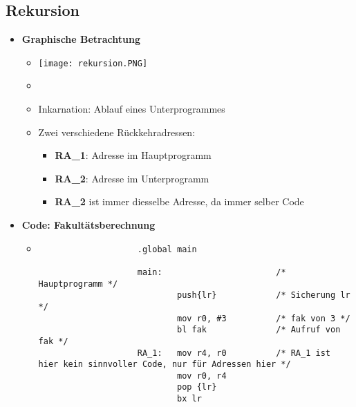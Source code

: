 \subsection{Rekursion}
    \begin{itemize}
        \item \textbf{Graphische Betrachtung}
            \begin{itemize}
                \item[] \texttt{[image: rekursion.PNG]}
                \item[] 
                \item Inkarnation: Ablauf eines Unterprogrammes
                \item Zwei verschiedene Rückkehradressen:
                    \begin{itemize}
                        \item \textbf{RA\_1}: Adresse im Hauptprogramm
                        \item \textbf{RA\_2}: Adresse im Unterprogramm
                        \item \textbf{RA\_2} ist immer diesselbe Adresse, da immer selber Code
                    \end{itemize} 
            \end{itemize}

\pagebreak

        \item \textbf{Code: Fakultätsberechnung}
            \begin{itemize}
                \item[]
                    \begin{verbatim}
                    .global main

                    main:                       /* Hauptprogramm */
                            push{lr}            /* Sicherung lr */
                            mov r0, #3          /* fak von 3 */
                            bl fak              /* Aufruf von fak */
                    RA_1:   mov r4, r0          /* RA_1 ist hier kein sinnvoller Code, nur für Adressen hier */
                            mov r0, r4
                            pop {lr}
                            bx lr
                    

\end{verbatim}
\end{itemize}
\end{itemize}
